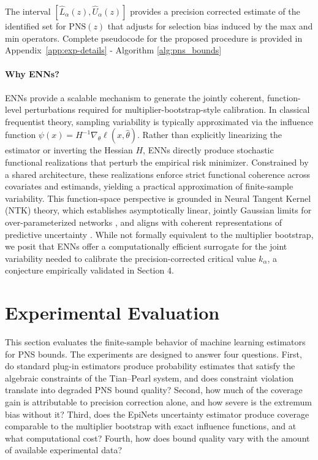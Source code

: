 \documentclass[accepted]{uai2026} %
\theoremstyle{plain}
\theoremstyle{definition}
\theoremstyle{remark}
\begin{document}
\noindent
The interval $[\hat{L}_\alpha(z), \hat{U}_\alpha(z)]$ provides a
precision corrected estimate of the identified set for $\mathrm{PNS}(z)$
that adjusts for selection bias induced by the max and min operators.
Complete pseudocode for the proposed procedure is provided in 
Appendix~\ref{app:exp-details} - Algorithm \ref{alg:pns_bounds}

\paragraph{Why ENNs?}
ENNs provide a scalable mechanism to generate the jointly coherent, 
function-level perturbations required for multiplier-bootstrap-style 
calibration. In classical frequentist theory, sampling variability is 
typically approximated via the influence function 
$\psi(x) = H^{-1} \nabla_{\theta} \ell(x,\hat{\theta})$. 
Rather than explicitly linearizing the estimator or inverting 
the Hessian $H$, ENNs directly produce stochastic functional 
realizations that perturb the empirical risk minimizer. 
Constrained by a shared architecture, these realizations enforce 
strict functional coherence across covariates and estimands, 
yielding a practical approximation of finite-sample variability. 
This function-space perspective is grounded in Neural Tangent Kernel 
(NTK) theory, which establishes asymptotically linear, jointly 
Gaussian limits for over-parameterized networks \citep{jacot2018neural}, 
and aligns with coherent representations of predictive uncertainty 
\citep{charpentier2020posterior}. While not formally equivalent 
to the multiplier bootstrap, we posit that ENNs offer a computationally 
efficient surrogate for the joint variability needed to calibrate 
the precision-corrected critical value $k_{\alpha}$, a conjecture 
empirically validated in Section 4.

\vspace{-0.5em} %

\section{Experimental Evaluation}\label{sec:experiments}

This section evaluates the finite-sample behavior of machine learning estimators for PNS bounds.
The experiments are designed to answer four questions. First, do
standard plug-in estimators produce probability estimates that satisfy the algebraic
constraints of the Tian–Pearl system, and does constraint violation translate into
degraded PNS bound quality? Second, how much of the coverage gain is attributable
to precision correction alone, and how severe is the extremum bias without it? Third,
does the EpiNets uncertainty estimator produce coverage comparable to the
multiplier bootstrap with exact influence functions, and at what computational cost?
Fourth, how does bound quality vary with the amount of available experimental data?
\end{document}

